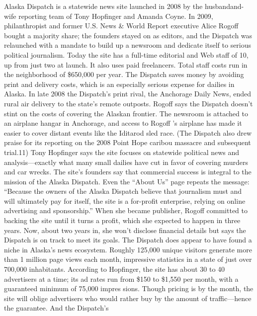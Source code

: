 Alaska Dispatch is a statewide news site launched in 2008 by the husbandand-
wife reporting team of Tony Hopfinger and Amanda Coyne. In 2009,
philanthropist and former U.S. News & World Report executive Alice Rogoff
bought a majority share; the founders stayed on as editors, and the Dispatch
was relaunched with a mandate to build up a newsroom and dedicate itself to
serious political journalism.
Today the site has a full-time editorial and Web staff of 10, up from just two
at launch. It also uses paid freelancers. Total staff costs run in the neighborhood
of \$650,000 per year. The Dispatch saves money by avoiding print and delivery
costs, which is an especially serious expense for dailies in Alaska. In late 2008 the
Dispatch's print rival, the Anchorage Daily News, ended rural air delivery to the
state's remote outposts.
Rogoff says the Dispatch doesn't stint on the costs of covering the Alaskan
frontier. The newsroom is attached to an airplane hangar in Anchorage, and access
to Rogoff 's airplane has made it easier to cover distant events like the Iditarod
sled race. (The Dispatch also drew praise for its reporting on the 2008
Point Hope caribou massacre and subsequent trial.11) Tony Hopfinger says the
site focuses on statewide political news and analysis—exactly what many small
dailies have cut in favor of covering murders and car wrecks.
The site's founders say that commercial success is integral to the mission of the
Alaska Dispatch. Even the ``About Us'' page repeats the message: ``Because the
owners of the Alaska Dispatch believe that journalism must and will ultimately
pay for itself, the site is a for-profit enterprise, relying on online advertising and
sponsorship.'' When she became publisher, Rogoff committed to backing the site
until it turns a profit, which she expected to happen in three years. Now, about
two years in, she won't disclose financial details but says the Dispatch is on track
to meet its goals.
The Dispatch does appear to have found a niche in Alaska's news ecosystem.
Roughly 125,000 unique visitors generate more than 1 million page views each
month, impressive statistics in a state of just over 700,000 inhabitants. According
to Hopfinger, the site has about 30 to 40 advertisers at a time; its ad rates run
from \$150 to \$1,550 per month, with a guaranteed minimum of 75,000 impres
sions. Though pricing is by the month, the site will oblige advertisers who would
rather buy by the amount of traffic—hence the guarantee. And the Dispatch's
